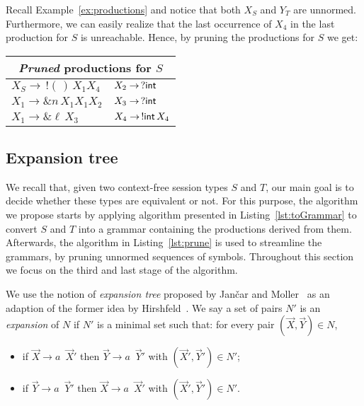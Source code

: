 \begin{example}
\label{ex:prune}
	Recall Example~\ref{ex:productions} and notice that both $X_S$ and $Y_T$
	are unnormed. Furthermore, we can easily realize that the last occurrence of
	$X_4$ in the last production for $S$ is unreachable. Hence, by pruning the
	productions for $S$ we get:\\

	\centering
	\begin{tabular}{l l}
		\multicolumn{2}{c}{\emph{Pruned} productions for $S$}\\ \hline
		$X_S \rightarrow \,! (\,)\,X_1 X_4$ &$X_2 \rightarrow \,? \mathsf{int}$\\
		$X_1 \rightarrow \& n\, X_1 X_1 X_2$&$X_3 \rightarrow \,? \mathsf{int}$\\
		$X_1 \rightarrow \& \ell\, X_3$ &$X_4 \rightarrow \,!\mathsf{int}\, X_4$\\
	\end{tabular}
\end{example}

\subsection{Expansion tree}
\label{subsec:expand}

We recall that, given two context-free session types $S$ and $T$, our main goal
is to decide whether these types are equivalent or not. For this purpose,
the algorithm we propose starts by applying algorithm presented in
Listing~\ref{lst:toGrammar} to convert $S$ and $T$ into a grammar containing
the productions derived from them. Afterwards, the algorithm in
Listing~\ref{lst:prune} is used to streamline the grammars, by pruning
unnormed sequences of symbols. Throughout this section we focus on the
third and last stage of the algorithm.

We use the notion of \emph{expansion tree} proposed by Jan{\v{c}}ar
and Moller~\cite{janvcar1999techniques} as an adaption of the former idea by
Hirshfeld~\cite{hirshfeld1996bisimulation}. We say a set of pairs $N'$ is an
\emph{expansion} of $N$ if $N'$ is a minimal set such that: for every pair
$(\vec X, \vec Y) \in N$,
\begin{itemize}
	\item if $\vec X \rightarrow a \enspace\vec X'$ then $\vec Y \rightarrow
		  a \enspace\vec Y'$ with $(\vec X',\vec Y')\in N'$;
	\item if $\vec Y \rightarrow a \enspace\vec Y'$ then $\vec X \rightarrow
	      a \enspace\vec X'$ with $(\vec X',\vec Y')\in N'$.
\end{itemize}

